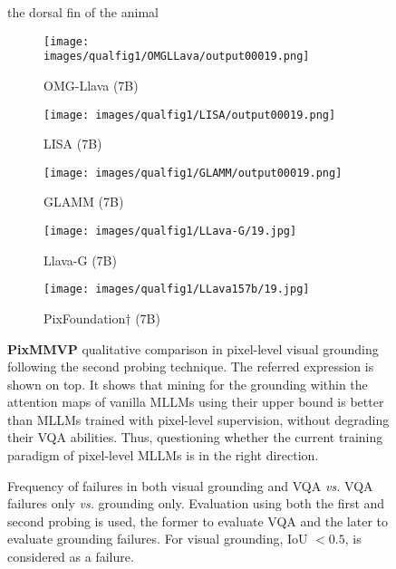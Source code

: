 \begin{figure*}[t]
\centering
the dorsal fin of the animal

\begin{subfigure}{0.2\textwidth}
\texttt{[image: images/qualfig1/OMGLLava/output00019.png]}
\caption{OMG-Llava (7B)}
\end{subfigure}%
\begin{subfigure}{0.2\textwidth}
\texttt{[image: images/qualfig1/LISA/output00019.png]}
\caption{LISA (7B)}
\end{subfigure}%
\begin{subfigure}{0.2\textwidth}
\texttt{[image: images/qualfig1/GLAMM/output00019.png]}
\caption{GLAMM (7B)}
\end{subfigure}%
\begin{subfigure}{0.2\textwidth}
\texttt{[image: images/qualfig1/LLava-G/19.jpg]}
\caption{Llava-G (7B)}
\end{subfigure}%
\begin{subfigure}{0.2\textwidth}
\texttt{[image: images/qualfig1/LLava157b/19.jpg]}
\caption{PixFoundation$\dagger$ (7B)}
\end{subfigure}
\vspace{-1em}
\caption{\textbf{PixMMVP} qualitative comparison in pixel-level visual grounding following the second probing technique. The referred expression is shown on top. It shows that mining for the grounding within the attention maps of vanilla MLLMs using their upper bound is better than MLLMs trained with pixel-level supervision, without degrading their VQA abilities. Thus, questioning whether the current training paradigm of pixel-level MLLMs is in the right direction.} 
\vspace{-0.5em}
\label{fig:qual}
\end{figure*}

\begin{figure*}[t]
\centering

\caption{Frequency of failures in both visual grounding and VQA \textit{vs.} VQA failures only \textit{vs.} grounding only. Evaluation using both the first and second probing is used, the former to evaluate VQA and the later to evaluate grounding failures. For visual grounding, IoU $< 0.5$, is considered as a failure.}
\vspace{-0.5em}
\label{fig:acciou-mmvp}
\end{figure*}

